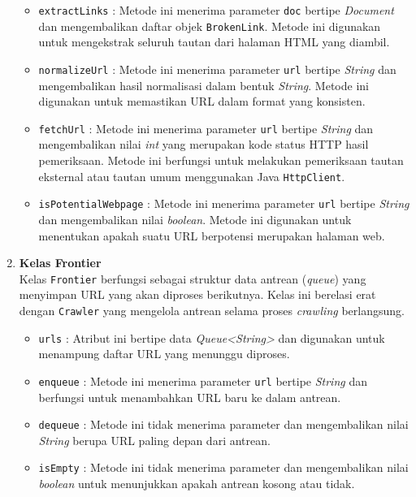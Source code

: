 \begin{enumerate}
\begin{itemize}
        \item \texttt{extractLinks} : Metode ini menerima parameter \texttt{doc} bertipe \textit{Document} dan mengembalikan daftar objek \texttt{BrokenLink}. Metode ini digunakan untuk mengekstrak seluruh tautan dari halaman HTML yang diambil.
        
        \item \texttt{normalizeUrl} : Metode ini menerima parameter \texttt{url} bertipe \textit{String} dan mengembalikan hasil normalisasi dalam bentuk \textit{String}. Metode ini digunakan untuk memastikan URL dalam format yang konsisten.
        
        \item \texttt{fetchUrl} : Metode ini menerima parameter \texttt{url} bertipe \textit{String} dan mengembalikan nilai \textit{int} yang merupakan kode status HTTP hasil pemeriksaan. Metode ini berfungsi untuk melakukan pemeriksaan tautan eksternal atau tautan umum menggunakan Java \texttt{HttpClient}.
        
        \item \texttt{isPotentialWebpage} : Metode ini menerima parameter \texttt{url} bertipe \textit{String} dan mengembalikan nilai \textit{boolean}. Metode ini digunakan untuk menentukan apakah suatu URL berpotensi merupakan halaman web.
    
    \end{itemize}

    \item \textbf{Kelas Frontier}\\
    Kelas \texttt{Frontier} berfungsi sebagai struktur data antrean (\textit{queue}) yang menyimpan URL yang akan diproses berikutnya. Kelas ini berelasi erat dengan \texttt{Crawler} yang mengelola antrean selama proses \textit{crawling} berlangsung.
    \begin{itemize}
        \item \texttt{urls} : Atribut ini bertipe data \textit{Queue<String>} dan digunakan untuk menampung daftar URL yang menunggu diproses.
        \item \texttt{enqueue} : Metode ini menerima parameter \texttt{url} bertipe \textit{String} dan berfungsi untuk menambahkan URL baru ke dalam antrean.
        \item \texttt{dequeue} : Metode ini tidak menerima parameter dan mengembalikan nilai \textit{String} berupa URL paling depan dari antrean.
        \item \texttt{isEmpty} : Metode ini tidak menerima parameter dan mengembalikan nilai \textit{boolean} untuk menunjukkan apakah antrean kosong atau tidak.
    \end{itemize}


\end{enumerate}

